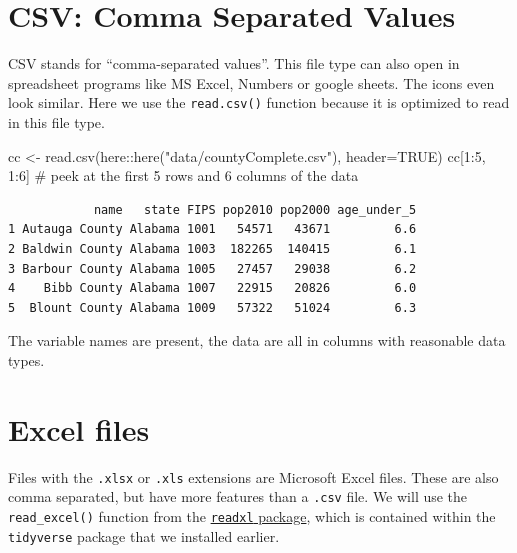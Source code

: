 \documentclass[
  letterpaper,
  DIV=11,
  numbers=noendperiod,
  oneside]{scrreprt}
\newenvironment{Shaded}{\begin{snugshade}}{\end{snugshade}}
\newcommand{\AttributeTok}[1]{\textcolor[rgb]{0.40,0.45,0.13}{#1}}
\newcommand{\CommentTok}[1]{\textcolor[rgb]{0.37,0.37,0.37}{#1}}
\newcommand{\ConstantTok}[1]{\textcolor[rgb]{0.56,0.35,0.01}{#1}}
\newcommand{\DecValTok}[1]{\textcolor[rgb]{0.68,0.00,0.00}{#1}}
\newcommand{\FunctionTok}[1]{\textcolor[rgb]{0.28,0.35,0.67}{#1}}
\newcommand{\NormalTok}[1]{\textcolor[rgb]{0.00,0.23,0.31}{#1}}
\newcommand{\OtherTok}[1]{\textcolor[rgb]{0.00,0.23,0.31}{#1}}
\newcommand{\SpecialCharTok}[1]{\textcolor[rgb]{0.37,0.37,0.37}{#1}}
\newcommand{\StringTok}[1]{\textcolor[rgb]{0.13,0.47,0.30}{#1}}
\begin{document}
\section{CSV: Comma Separated Values}\label{csv-comma-separated-values}

CSV stands for ``comma-separated values''. This file type can also open
in spreadsheet programs like MS Excel, Numbers or google sheets. The
icons even look similar. Here we use the \texttt{read.csv()} function
because it is optimized to read in this file type.
{}

\begin{Shaded}
\begin{Highlighting}[]
\NormalTok{cc }\OtherTok{\textless{}{-}} \FunctionTok{read.csv}\NormalTok{(here}\SpecialCharTok{::}\FunctionTok{here}\NormalTok{(}\StringTok{"data/countyComplete.csv"}\NormalTok{), }\AttributeTok{header=}\ConstantTok{TRUE}\NormalTok{)}
\NormalTok{cc[}\DecValTok{1}\SpecialCharTok{:}\DecValTok{5}\NormalTok{, }\DecValTok{1}\SpecialCharTok{:}\DecValTok{6}\NormalTok{] }\CommentTok{\# peek at the first 5 rows and 6 columns of the data}
\end{Highlighting}
\end{Shaded}

\begin{verbatim}
            name   state FIPS pop2010 pop2000 age_under_5
1 Autauga County Alabama 1001   54571   43671         6.6
2 Baldwin County Alabama 1003  182265  140415         6.1
3 Barbour County Alabama 1005   27457   29038         6.2
4    Bibb County Alabama 1007   22915   20826         6.0
5  Blount County Alabama 1009   57322   51024         6.3
\end{verbatim}

The variable names are present, the data are all in columns with
reasonable data types.

\section{Excel files}\label{excel-files}

Files with the \texttt{.xlsx} or \texttt{.xls} extensions are Microsoft
Excel files. These are also comma separated, but have more features than
a \texttt{.csv} file. We will use the \texttt{read\_excel()} function
from the \href{http://readxl.tidyverse.org/}{\texttt{readxl} package},
which is contained within the \texttt{tidyverse} package that we
installed earlier.
\end{document}
